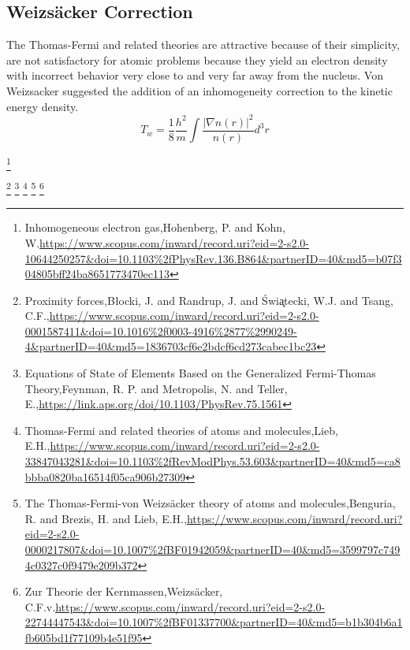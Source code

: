 \subsection{Weizsäcker Correction}
The Thomas-Fermi and related theories are attractive because of their simplicity, are not satisfactory for atomic problems because they yield an electron density with incorrect behavior very close to and very far away from the nucleus. Von Weizsacker suggested the addition of an inhomogeneity correction to the kinetic energy density.
\begin{equation}
T_w=\frac{1}{8}\frac{h^2}{m}\int \frac{|\nabla n(r)|^2}{n(r)}d^3r
\end{equation}



\footnote{Inhomogeneous electron gas,Hohenberg, P. and Kohn, W.\url{https://www.scopus.com/inward/record.uri?eid=2-s2.0-10644250257&doi=10.1103\%2fPhysRev.136.B864&partnerID=40&md5=b07f304805bff24ba8651773470ec113}}

\footnote{Proximity forces,Błocki, J. and Randrup, J. and Świa̧tecki, W.J. and Tsang, C.F.,\url{https://www.scopus.com/inward/record.uri?eid=2-s2.0-0001587411&doi=10.1016\%2f0003-4916\%2877\%2990249-4&partnerID=40&md5=1836703cf6e2bdcf6cd273cabec1bc23}}
\footnote{Equations of State of Elements Based on the Generalized Fermi-Thomas Theory,Feynman, R. P. and Metropolis, N. and Teller, E.,\url{https://link.aps.org/doi/10.1103/PhysRev.75.1561}}
\footnote{Thomas-Fermi and related theories of atoms and molecules,Lieb, E.H.,\url{https://www.scopus.com/inward/record.uri?eid=2-s2.0-33847043281&doi=10.1103\%2fRevModPhys.53.603&partnerID=40&md5=ca8bbba0820ba16514f05ca906b27309}}
\footnote{The Thomas-Fermi-von Weizsäcker theory of atoms and molecules,Benguria, R. and Brezis, H. and Lieb, E.H.,\url{https://www.scopus.com/inward/record.uri?eid=2-s2.0-0000217807&doi=10.1007\%2fBF01942059&partnerID=40&md5=3599797c7494c0327c0f9479e209b372}}
\footnote{Zur Theorie der Kernmassen,Weizsäcker, C.F.v.\url{https://www.scopus.com/inward/record.uri?eid=2-s2.0-22744447543&doi=10.1007\%2fBF01337700&partnerID=40&md5=b1b304b6a1fb605bd1f77109b4e51f95}}


